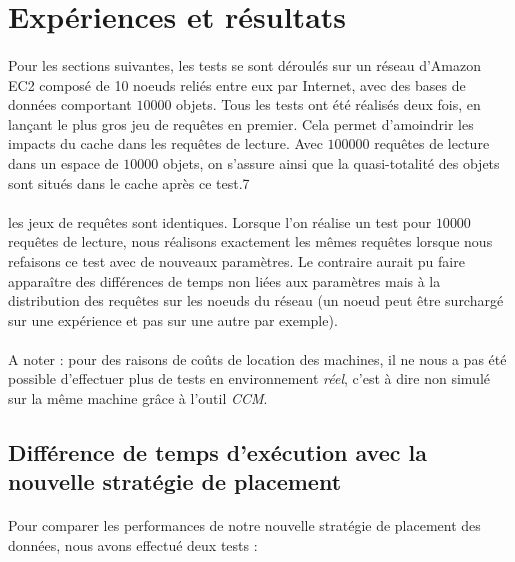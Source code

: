 \documentclass[12pt]{article}
\begin{document}
\section{Expériences et résultats}

\paragraph{}Pour les sections suivantes, les tests se sont déroulés sur un réseau d'Amazon EC2 composé de 10 noeuds reliés entre eux par Internet, avec des bases de données comportant $10 000$ objets. Tous les tests ont été réalisés deux fois, en lançant le plus gros jeu de requêtes en premier. Cela permet d'amoindrir les impacts du cache dans les requêtes de lecture. Avec $100 000$ requêtes de lecture dans un espace de $10 000$ objets, on s'assure ainsi que la quasi-totalité des objets sont situés dans le cache après ce test.7

\paragraph{}les jeux de requêtes sont identiques. Lorsque l'on réalise un test pour $10 000$ requêtes de lecture, nous réalisons exactement les mêmes requêtes lorsque nous refaisons ce test avec de nouveaux paramètres. Le contraire aurait pu faire apparaître des différences de temps non liées aux paramètres mais à la distribution des requêtes sur les noeuds du réseau (un noeud peut être surchargé sur une expérience et pas sur une autre par exemple).

\paragraph{}A noter : pour des raisons de coûts de location des machines, il ne nous a pas été possible d'effectuer plus de tests en environnement \textit{réel}, c'est à dire non simulé sur la même machine grâce à l'outil \textit{CCM}.

\subsection{Différence de temps d'exécution avec la nouvelle stratégie de placement}

\paragraph{}Pour comparer les performances de notre nouvelle stratégie de placement des données, nous avons effectué deux tests :
\end{document}
